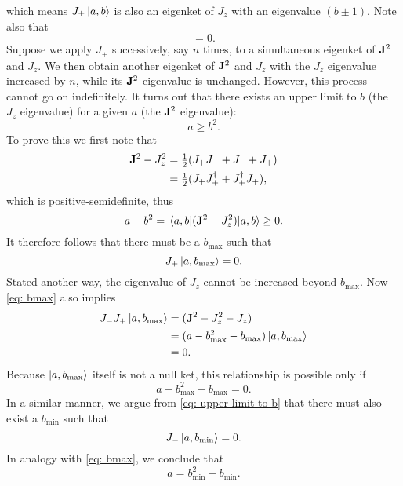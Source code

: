 \documentclass[10pt]{article}
\begin{document}
	which means $J_{\pm} \ket{a,b}$ is also an eigenket of $J_z$ with an eigenvalue $(b \pm 1)$. Note also that
	\begin{equation}
		[\bfJ^2, J_{\pm}] = 0.
	\end{equation}
	Suppose we apply $J_+$ successively, say $n$ times, to a simultaneous eigenket of ${\bf J}^2$ and $J_z$. We then obtain another eigenket of ${\bf J}^2$ and $J_z$ with the $J_z$ eigenvalue increased by $n$, while its ${\bf J}^2$ eigenvalue is unchanged. However, this process cannot go on indefinitely. It turns out that there exists an upper limit to $b$ (the $J_z$ eigenvalue) for a given $a$ (the ${\bf J}^2$ eigenvalue):
	\begin{equation}
		a \ge b^2. \label{eq: upper limit to b}
	\end{equation}
	To prove this we first note that
	\begin{align*}
		{\bf J}^2 - J_z^2 &= \tfrac{1}{2} (J_+ J_- + J_- + J_+) \\
		&= \tfrac{1}{2} (J_+ J_+^{\dagger} + J_+^{\dagger} J_+),
	\end{align*}
	which is positive-semidefinite, thus
	\begin{equation}
		a - b^2 = \ev{(\bfJ^2 - J_z^2)}{a,b} \ge 0.
	\end{equation}
	It therefore follows that there must be a $b_{\max}$ such that
	\begin{equation}
		J_+ \ket{a, b_{\max}} = 0. \label{eq: bmax}
	\end{equation}
	Stated another way, the eigenvalue of $J_z$ cannot be increased beyond $b_{\max}$. Now \eqref{eq: bmax} also implies
	\begin{align*}
		J_- J_+ \ket{a, b_{\max}} &= ({\bf J}^2 - J_z^2 - J_z) \\
		&= (a - b_{\max}^2 - b_{\max}) \ket{a, b_{\max}}\\
		&= 0.
	\end{align*}
	Because $\ket{a, b_{\max}}$ itself is not a null ket, this relationship is possible only if
	\begin{equation}
		a - b_{\max}^2 - b_{\max} = 0.
	\end{equation}
	In a similar manner, we argue from \eqref{eq: upper limit to b} that there must also exist a $b_{\min}$ such that
	\begin{equation}
		J_- \ket{a, b_{\min}} = 0.
	\end{equation}
	In analogy with \eqref{eq: bmax}, we conclude that
	\begin{equation}
		a = b_{\min}^2 - b_{\min}.
	\end{equation}
\end{document}
